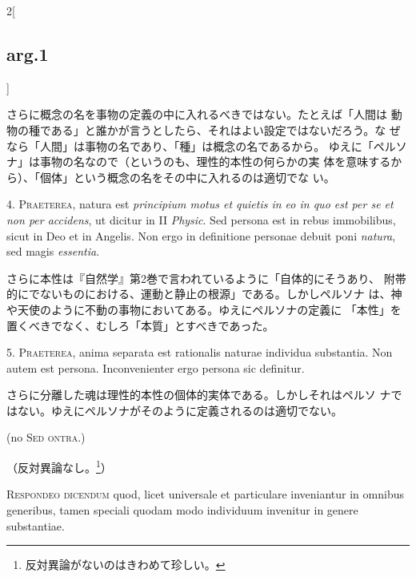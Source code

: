 \documentclass[paper=a4paper,fontsize=10pt,jafontsize=9pt,titlepage]{jlreq}
\begin{document}
\begin{paracol}{2}[\subsection{arg.1}]
\switchcolumn

さらに概念の名を事物の定義の中に入れるべきではない。たとえば「人間は
 動物の種である」と誰かが言うとしたら、それはよい設定ではないだろう。な
 ぜなら「人間」は事物の名であり、「種」は概念の名であるから。
ゆえに「ペルソナ」は事物の名なので（というのも、理性的本性の何らかの実
 体を意味するから）、「個体」という概念の名をその中に入れるのは適切でな
 い。


4. {\scshape Praeterea}, natura est {\itshape principium motus et quietis in eo in quo est per
se et non per accidens}, ut dicitur in II {\itshape Physic}. Sed persona est in
rebus immobilibus, sicut in Deo et in Angelis. Non ergo in definitione
personae debuit poni {\itshape natura}, sed magis {\itshape essentia}.

\switchcolumn

さらに本性は『自然学』第2巻で言われているように「自体的にそうあり、
 附帯的にでないものにおける、運動と静止の根源」である。しかしペルソナ
 は、神や天使のように不動の事物においてある。ゆえにペルソナの定義に
 「本性」を置くべきでなく、むしろ「本質」とすべきであった。


5. {\scshape Praeterea}, anima separata est rationalis naturae individua
substantia. Non autem est persona. Inconvenienter ergo persona sic
definitur.

\switchcolumn

さらに分離した魂は理性的本性の個体的実体である。しかしそれはペルソ
 ナではない。ゆえにペルソナがそのように定義されるのは適切でない。

\switchcolumn*

(no {\scshape Sed ontra.})

\switchcolumn

（反対異論なし。\footnote{反対異論がないのはきわめて珍しい。}）


{\scshape Respondeo dicendum} quod, licet universale et particulare inveniantur in
omnibus generibus, tamen speciali quodam modo individuum invenitur in
genere substantiae.


\end{paracol}
\end{document}
